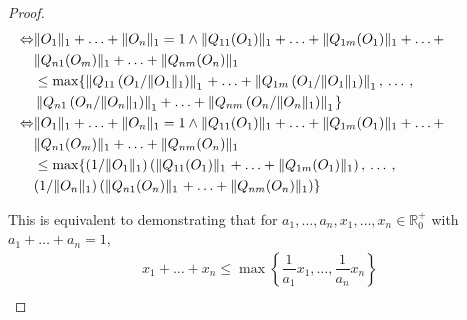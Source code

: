 \begin{proof}
\begin{align*}
    \hspace{-30pt} \Leftrightarrow  & \lVert O_1  \rVert_1  + \ldots + \lVert O_n  \rVert_1 = 1  \wedge  \lVert Q_{11} (O_{1}) \rVert_{1} + \ldots +  \lVert Q_{1m} (O_{1}) \rVert_{1} + \ldots +  \hspace{10pt}\\
    \hspace{-30pt} & \lVert Q_{n1} (O_{m}) \rVert_{1} +  \ldots  + \lVert Q_{nm} (O_{n}) \rVert_{1}   \\
    \hspace{-30pt}& \leq \max \{ \left\lVert Q_{11} \left(O_{1} / \lVert O_{1} \rVert_1\right) \right\rVert_{1} \hspace{1pt} + \ldots +  \left\lVert Q_{1m}  \left(O_{1} / \lVert O_{1} \rVert_1\right) \right\rVert_{1}, \hspace{2pt} \ldots \hspace{2pt},   \\
    \hspace{-30pt}& \left\lVert Q_{n1}  \left(O_{n} / \lVert O_{n} \rVert_1\right) \right\rVert_{1} + \ldots + \left\lVert Q_{nm}   \left(O_{n} / \lVert O_{n} \rVert_1\right) \right\rVert_{1} \hspace{1pt} \}  \\
    \hspace{-30pt} \Leftrightarrow  & \lVert O_1  \rVert_1  + \ldots + \lVert O_n  \rVert_1 = 1  \wedge  \lVert Q_{11} (O_{1}) \rVert_{1} + \ldots +  \lVert Q_{1m} (O_{1}) \rVert_{1} + \ldots +  \hspace{10pt}\\
    \hspace{-30pt} & \lVert Q_{n1} (O_{m}) \rVert_{1} +  \ldots  + \lVert Q_{nm} (O_{n}) \rVert_{1}   \\
    \hspace{-30pt}& \leq \max \{ (1 / \lVert O_{1} \rVert_1)   \left(\lVert Q_{11} (O_{1}) \rVert_{1} \hspace{1pt} + \ldots +  \lVert Q_{1m} (O_{1})\rVert_{1} \right), \hspace{2pt} \ldots \hspace{2pt},   \\
    \hspace{-30pt}& (1 / \lVert O_{n} \rVert_1)   \left(\lVert Q_{n1} (O_{n}) \rVert_{1} \hspace{1pt} + \ldots +  \lVert Q_{nm} (O_{n})\rVert_{1} \right) \}  
    \end{align*}
  
    This is equivalent to demonstrating that for $a_1, \ldots, a_n, x_1, \ldots, x_n \in \mathbb{R}^{+}_{0}$ with $a_1+ \ldots + a_n=1$,
    \begin{equation} 
    \begin{split}
        x_1 + \ldots + x_n  \leq  \max \left\{   \dfrac{1}{a_1} x_1  , \ldots , \dfrac{1}{a_n} x_n   \right\} \\
    \end{split}
    \end{equation}
  

\end{proof}
